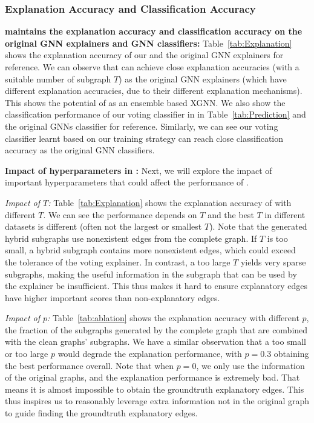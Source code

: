 \subsubsection{Explanation Accuracy and Classification Accuracy}
\label{sec:res_emp}
{\bf {\name} maintains the explanation accuracy and classification accuracy on the original GNN explainers  and GNN classifiers:}
Table~\ref{tab:Explanation} shows the explanation accuracy of our {\name} and the original GNN explainers for reference.  
We can observe that {\name} can achieve close explanation accuracies (with a suitable number of subgraph $T$) as the original GNN explainers (which have   different explanation accuracies, due to their different explanation mechanisms). 
This shows the potential of {\name}
as an ensemble based XGNN.   
We also show the classification performance of our voting classifier in {\name} in Table~\ref{tab:Prediction} and  
the original GNNs  classifier for reference. Similarly, we can see our voting classifier learnt based on our training strategy can reach close classification accuracy as the original GNN classifiers.

{\bf Impact of hyperparameters in {\name}:} Next, we will explore the impact of important hyperparameters that  could affect the performance of {\name}. 

\emph{Impact of $T$:} 
Table~\ref{tab:Explanation} shows the 
explanation accuracy of {\name} with different $T$. 
We can see the performance depends on $T$ and the best $T$ in different datasets is different (often not the largest or smallest $T$). Note that the generated hybrid subgraphs use nonexistent edges from the complete graph. If $T$ is too small,  a hybrid subgraph   contains more nonexistent edges, which could exceed the tolerance of the voting explainer. In contrast, a too large $T$ yields very sparse subgraphs, making the useful information in the subgraph that can be used by the explainer be insufficient. This thus makes it hard to ensure explanatory edges have higher important scores than non-explanatory edges. 

\emph{Impact of $p$:} Table~\ref{tab:ablation} shows the explanation accuracy with different $p$, the fraction of the subgraphs generated by the complete graph that are combined with the clean graphs' subgraphs. 
We have a similar observation that a too small or too large $p$ would degrade the explanation performance, with $p=0.3$ obtaining the best performance overall. 
Note that when $p=0$, we only use the information of the original graphs, and the explanation performance is extremely bad. That means it is almost impossible to obtain the groundtruth explanatory edges. 
This thus inspires us to reasonably leverage extra information not in the original graph to guide finding the groundtruth explanatory edges. 

